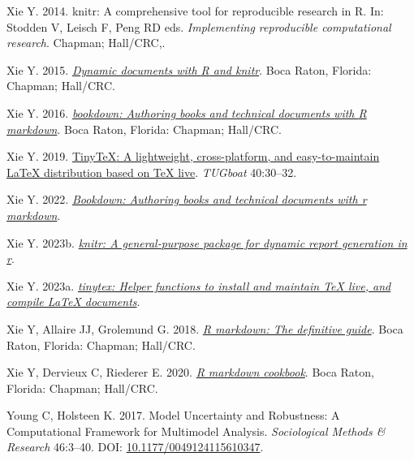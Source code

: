 \documentclass[10pt,a4paper]{article}
\newlength{\cslhangindent}
\newlength{\cslentryspacingunit} %
\newenvironment{CSLReferences}[2] %
 {%
  \setlength{\parindent}{0pt}
  \ifodd #1
  \let\oldpar\par
  \def\par{\hangindent=\cslhangindent\oldpar}
  \fi
  \setlength{\parskip}{#2\cslentryspacingunit}
 }%
 {}
\begin{document}
\begin{CSLReferences}{1}{0}
\leavevmode{}%
Xie Y. 2014. {knitr}: A comprehensive tool for reproducible research in {R}. In: Stodden V, Leisch F, Peng RD eds. \emph{Implementing reproducible computational research}. Chapman; Hall/CRC,.

\leavevmode{}%
Xie Y. 2015. \emph{\href{https://yihui.org/knitr/}{Dynamic documents with {R} and knitr}}. Boca Raton, Florida: Chapman; Hall/CRC.

\leavevmode{}%
Xie Y. 2016. \emph{\href{https://bookdown.org/yihui/bookdown}{{bookdown}: Authoring books and technical documents with {R} markdown}}. Boca Raton, Florida: Chapman; Hall/CRC.

\leavevmode{}%
Xie Y. 2019. \href{https://tug.org/TUGboat/Contents/contents40-1.html}{{TinyTeX}: A lightweight, cross-platform, and easy-to-maintain LaTeX distribution based on TeX live}. \emph{TUGboat} 40:30--32.

\leavevmode{}%
Xie Y. 2022. \emph{\href{https://CRAN.R-project.org/package=bookdown}{Bookdown: Authoring books and technical documents with r markdown}}.

\leavevmode{}%
Xie Y. 2023b. \emph{\href{https://yihui.org/knitr/}{{knitr}: A general-purpose package for dynamic report generation in r}}.

\leavevmode{}%
Xie Y. 2023a. \emph{\href{https://github.com/rstudio/tinytex}{{tinytex}: Helper functions to install and maintain TeX live, and compile LaTeX documents}}.

\leavevmode{}%
Xie Y, Allaire JJ, Grolemund G. 2018. \emph{\href{https://bookdown.org/yihui/rmarkdown}{R markdown: The definitive guide}}. Boca Raton, Florida: Chapman; Hall/CRC.

\leavevmode{}%
Xie Y, Dervieux C, Riederer E. 2020. \emph{\href{https://bookdown.org/yihui/rmarkdown-cookbook}{R markdown cookbook}}. Boca Raton, Florida: Chapman; Hall/CRC.

\leavevmode{}%
Young C, Holsteen K. 2017. Model {Uncertainty} and {Robustness}: {A} {Computational} {Framework} for {Multimodel} {Analysis}. \emph{Sociological Methods \& Research} 46:3--40. DOI: \href{https://doi.org/10.1177/0049124115610347}{10.1177/0049124115610347}.

\end{CSLReferences}
\end{document}
